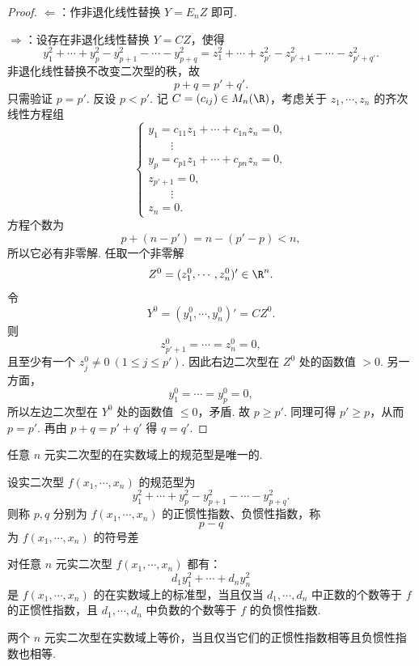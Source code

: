 \begin{proof}
	$\Leftarrow$：作非退化线性替换 $Y=E_nZ$ 即可.
	
	$\Rightarrow$：设存在非退化线性替换 $Y=CZ$，使得
	\[
	y_1^2+\cdots+y_p^2-y_{p+1}^2-\cdots-y_{p+q}^2
	=
	z_1^2+\cdots+z_{p'}^2-z_{p'+1}^2-\cdots-z_{p'+q'}^2.
	\]
	非退化线性替换不改变二次型的秩，故
	\[
	p+q=p'+q'.
	\]
	只需验证 $p=p'$. 反设 $p<p'$. 记 $C=(c_{ij})\in M_n(\R)$，考虑关于 $z_1,\cdots,z_n$ 的齐次线性方程组
	\[
	\begin{cases}
		y_1=c_{11}z_1+\cdots+c_{1n}z_n=0,\\
		\qquad\vdots\\
		y_p=c_{p1}z_1+\cdots+c_{pn}z_n=0,\\
		z_{p'+1}=0,\\
		\qquad\vdots\\
		z_n=0.
	\end{cases}
	\]
	方程个数为
	\[
	p+(n-p')=n-(p'-p)<n,
	\]
	所以它必有非零解. 任取一个非零解
	\[
	Z^0=(z_1^0,\cdots,z_n^0)'\in\R^n.
	\]
	令
	\[
	Y^0=(y_1^0,\cdots,y_n^0)'=CZ^0.
	\]
	则
	\[
	z_{p'+1}^0=\cdots=z_n^0=0,
	\]
	且至少有一个 $z_j^0\ne0\ (1\le j\le p')$. 因此右边二次型在 $Z^0$ 处的函数值 $>0$. 另一方面，
	\[
	y_1^0=\cdots=y_p^0=0,
	\]
	所以左边二次型在 $Y^0$ 处的函数值 $\le0$，矛盾. 故 $p\ge p'$. 同理可得 $p'\ge p$，从而 $p=p'$. 再由 $p+q=p'+q'$ 得 $q=q'$.
\end{proof}

\begin{corollary}
	任意 $n$ 元实二次型的在实数域上的规范型是唯一的.
\end{corollary}

\begin{definition}\label{p1:concept:c7-l1527}
	设实二次型 $f(x_1,\cdots,x_n)$ 的规范型为
	\[
	y_1^2+\cdots+y_p^2-y_{p+1}^2-\cdots-y_{p+q}^2.
	\]
	则称 $p,q$ 分别为 $f(x_1,\cdots,x_n)$ 的正惯性指数、负惯性指数，称
	\[
	p-q
	\]
	为 $f(x_1,\cdots,x_n)$ 的符号差
\end{definition}

\begin{corollary}
	对任意 $n$ 元实二次型 $f(x_1,\cdots,x_n)$ 都有：
	\[
	d_1y_1^2+\cdots+d_ny_n^2
	\]
	是 $f(x_1,\cdots,x_n)$ 的在实数域上的标准型，当且仅当 $d_1,\cdots,d_n$ 中正数的个数等于 $f$ 的正惯性指数，且 $d_1,\cdots,d_n$ 中负数的个数等于 $f$ 的负惯性指数.
\end{corollary}

\begin{corollary}
	两个 $n$ 元实二次型在实数域上等价，当且仅当它们的正惯性指数相等且负惯性指数也相等.
\end{corollary}

